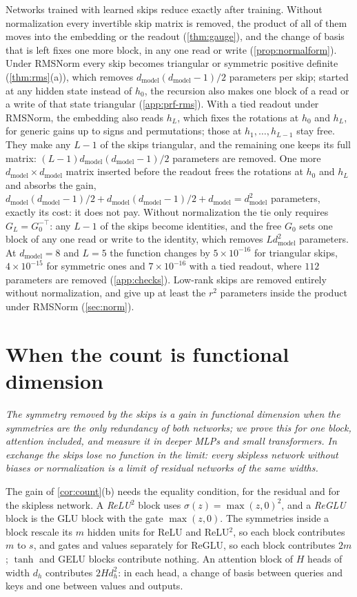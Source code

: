 \documentclass[10pt]{article}
\theoremstyle{definition}
\theoremstyle{remark}
\newcommand{\dm}{d_{\mathrm{model}}}
\newcommand{\takeaway}[1]{\noindent\textit{#1}\par\smallskip}
\begin{document}
Networks trained with learned skips reduce exactly after training. Without normalization every invertible skip matrix is removed, the product of all of them moves into the embedding or the readout (\cref{thm:gauge}), and the change of basis that is left fixes one more block, in any one read or write (\cref{prop:normalform}). Under RMSNorm every skip becomes triangular or symmetric positive definite (\cref{thm:rms}(a)), which removes $\dm(\dm-1)/2$ parameters per skip; started at any hidden state instead of $h_0$, the recursion also makes one block of a read or a write of that state triangular (\cref{app:prf-rms}). With a tied readout under RMSNorm, the embedding also reads $h_L$, which fixes the rotations at $h_0$ and $h_L$, for generic gains up to signs and permutations; those at $h_1, \dots, h_{L-1}$ stay free. They make any $L - 1$ of the skips triangular, and the remaining one keeps its full matrix: $(L-1)\dm(\dm-1)/2$ parameters are removed. One more $\dm \times \dm$ matrix inserted before the readout frees the rotations at $h_0$ and $h_L$ and absorbs the gain, $\dm(\dm-1)/2 + \dm(\dm-1)/2 + \dm = \dm^2$ parameters, exactly its cost: it does not pay. Without normalization the tie only requires $G_L = G_0^{-\top}$: any $L - 1$ of the skips become identities, and the free $G_0$ sets one block of any one read or write to the identity, which removes $L\dm^2$ parameters. At $\dm = 8$ and $L = 5$ the function changes by $5\times10^{-16}$ for triangular skips, $4\times10^{-15}$ for symmetric ones and $7\times10^{-16}$ with a tied readout, where $112$ parameters are removed (\cref{app:checks}). Low-rank skips are removed entirely without normalization, and give up at least the $r^2$ parameters inside the product under RMSNorm (\cref{sec:norm}).

\section{When the count is functional dimension}\label{sec:gain}

\takeaway{The symmetry removed by the skips is a gain in functional dimension when the symmetries are the only redundancy of both networks; we prove this for one block, attention included, and measure it in deeper MLPs and small transformers. In exchange the skips lose no function in the limit: every skipless network without biases or normalization is a limit of residual networks of the same widths.}

The gain of \cref{cor:count}(b) needs the equality condition, for the residual and for the skipless network. A \emph{ReLU$^2$} block \citep{so2021primer} uses $\sigma(z) = \max(z, 0)^2$, and a \emph{ReGLU} block \citep{shazeer2020glu} is the GLU block with the gate $\max(z, 0)$. The symmetries inside a block rescale its $m$ hidden units for ReLU and ReLU$^2$, so each block contributes $m$ to $s$, and gates and values separately for ReGLU, so each block contributes $2m$; $\tanh$ and GELU blocks contribute nothing. An attention block of $H$ heads of width $d_h$ contributes $2Hd_h^2$: in each head, a change of basis between queries and keys and one between values and outputs.
\end{document}
